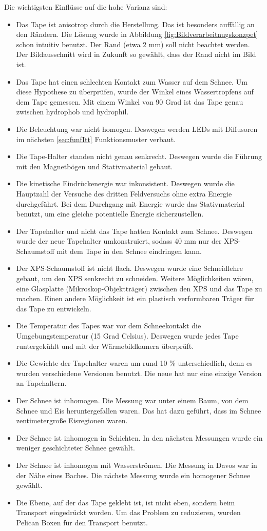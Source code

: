 Die wichtigsten Einflüsse auf die hohe Varianz sind:
\begin{itemize}
\item Das Tape ist anisotrop durch die Herstellung. Das ist besonders auffällig an den Rändern. Die Lösung wurde in Abbildung \ref{fig:Bildverarbeitnugskonzpet} schon intuitiv benutzt. Der Rand (etwa 2 mm) soll nicht beachtet werden. Der Bildausschnitt wird in Zukunft so gewählt, dass der Rand nicht im Bild ist.
\item Das Tape hat einen schlechten Kontakt zum Wasser auf dem Schnee. Um diese Hypothese zu überprüfen, wurde der Winkel eines Wassertropfens auf dem Tape gemessen. Mit einem Winkel von 90 Grad ist das Tape genau zwischen hydrophob und hydrophil.
\item Die Beleuchtung war nicht homogen. Deswegen werden LEDs mit Diffusoren im nächsten \ref{sec:funfItt} Funktionsmuster verbaut.
\item Die Tape-Halter standen nicht genau senkrecht. Deswegen wurde die Führung mit den Magnetbögen und Stativmaterial gebaut.
\item Die kinetische Eindrückenergie war inkonsistent. Deswegen wurde die Hauptzahl der Versuche des dritten Feldversuchs ohne extra Energie durchgeführt. Bei dem Durchgang mit Energie wurde das Stativmaterial benutzt, um eine gleiche potentielle Energie sicherzustellen.
\item Der Tapehalter und nicht das Tape hatten Kontakt zum Schnee. Deswegen wurde der neue Tapehalter umkonstruiert, sodass 40 mm nur der XPS-Schaumstoff mit dem Tape in den Schnee eindringen kann.
\item Der XPS-Schaumstoff ist nicht flach. Deswegen wurde eine Schneidlehre gebaut, um den XPS senkrecht zu schneiden. Weitere Möglichkeiten wären, eine Glasplatte (Mikroskop-Objektträger) zwischen den XPS und das Tape zu machen. Einen andere Möglichkeit ist ein  plastisch verformbaren Träger für das Tape zu entwickeln.
\item Die Temperatur des Tapes war vor dem Schneekontakt die Umgebungstemperatur (15 Grad Celsius). Deswegen wurde jedes Tape runtergekühlt und mit der Wärmebildkamera überprüft.
\item Die Gewichte der Tapehalter waren um rund 10 \% unterschiedlich, denn es wurden verschiedene Versionen benutzt. Die neue hat nur eine einzige Version an Tapehaltern.
\item Der Schnee ist inhomogen. Die Messung war unter einem Baum, von dem Schnee und Eis heruntergefallen waren. Das hat dazu geführt, dass im Schnee zentimetergroße Eisregionen waren.
\item Der Schnee ist inhomogen in Schichten. In den nächsten Messungen wurde ein weniger geschichteter Schnee gewählt.
\item Der Schnee ist inhomogen mit Wasserströmen. Die Messung in Davos war in der Nähe eines Baches. Die nächste Messung wurde ein homogener Schnee gewählt.
\item Die Ebene, auf der das Tape geklebt ist, ist nicht eben, sondern beim Transport eingedrückt worden. Um das Problem zu reduzieren, wurden Pelican Boxen für den Transport benutzt.
\end{itemize}

